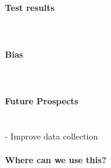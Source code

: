 \paragraph{Test results} \hspace{0pt} \\


\paragraph{Bias} \hspace{0pt} \\


\paragraph{Future Prospects} \hspace{0pt} \\
	- Improve data collection


\paragraph{Where can we use this?} \hspace{0pt} \\

